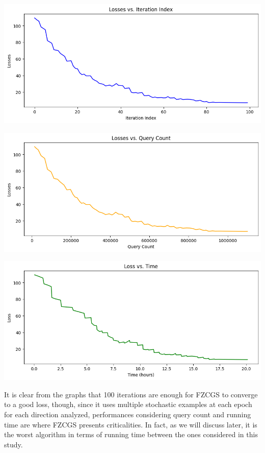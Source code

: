 \documentclass[10pt,twocolumn,letterpaper]{article}
\begin{document}
\begin{center}
   \includegraphics*[scale=0.35]{img/FZCGS_loss_vs_iterations.png}
\end{center}

\begin{center}
   \includegraphics*[scale=0.35]{img/FZCGS_loss_vs_querycount.png}
\end{center}

\begin{center}
   \includegraphics*[scale=0.35]{img/FZCGS_loss_vs_runningtime.png}
\end{center}

It is clear from the graphs that 100 iterations are enough for FZCGS to converge to a good loss,
though, since it uses multiple stochastic examples at each epoch for each direction analyzed, 
performances considering query count and running time are where FZCGS presents criticalities.
In fact, as we will discuss later, it is the worst algorithm in terms of running time between the ones
considered in this study. 
\end{document}

